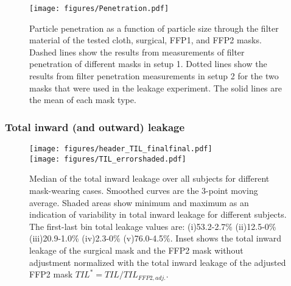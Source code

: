 \documentclass[preprint]{elsarticle}
\begin{document}
\begin{figure}[htbp]
	\centering
	\texttt{[image: figures/Penetration.pdf]}
	\caption{Particle penetration as a function of particle size through the filter material of the tested cloth, surgical, FFP1, and FFP2 masks. Dashed lines show the results from measurements of filter penetration of different masks in setup 1. Dotted lines show the results from filter penetration measurements in setup 2 for the two masks that were used in the leakage experiment. The solid lines are the mean of each mask type.}
	\label{fig:masktransmission}
\end{figure}

\subsubsection{Total inward (and outward) leakage}
\label{sec:TIL_results}
\begin{figure}[htbp]
	\centering
	\texttt{[image: figures/header\_TIL\_finalfinal.pdf]}\\
	\texttt{[image: figures/TIL\_errorshaded.pdf]}
	\caption{Median of the total inward leakage over all subjects for different mask-wearing cases. Smoothed curves are the 3-point moving average. Shaded areas show minimum and maximum as an indication of variability in total inward leakage for different subjects. The first-last bin total leakage values are: (i)53.2-2.7\% (ii)12.5-0\% (iii)20.9-1.0\% (iv)2.3-0\% (v)76.0-4.5\%. Inset shows the total inward leakage of the surgical mask and the FFP2 mask without adjustment normalized with the total inward leakage of the adjusted FFP2 mask $TIL^*=TIL/TIL_{FFP2,adj.}$.}
	\label{fig:maskleakage}
\end{figure}
\end{document}
